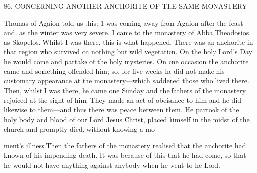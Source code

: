 86.
CONCERNING ANOTHER ANCHORITE
OF THE SAME MONASTERY

Thomas of Agaion told us this: 1 was coming away from Agaion
after the feast and, as the winter was very severe, I came to the
monastery of Abba Theodosios as Skopelos.
Whilst I was there, this
is what happened.
There was an anchorite in that region who
survived on nothing but wild vegetation.
On the holy Lord's Day he
would come and partake of the holy mysteries.
On one occasion the
anchorite came and something offended him; so, for five weeks he
did not make his customary appearance at the monastery—which
saddened those who lived there.
Then, whilst I was there, he came
one Sunday and the fathers of the monastery rejoiced at the sight of
him.
They made an act of obeisance to him and he did likewise to
them—and thus there was peace between them.
He partook of the
holy body and blood of our Lord Jesus Christ, placed himself in the
midst of the church and promptly died, without knowing a mo-

ment's illness.Then the fathers of the monastery realised that the
anchorite had known of his impending death.
It was because of this
that he had come, so that he would not have anything against
anybody when he went to he Lord.

